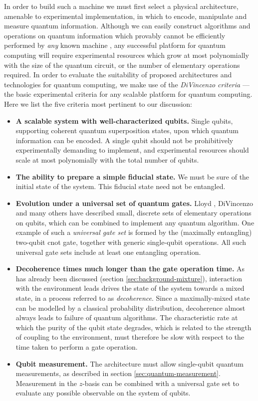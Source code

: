 In order to build such a machine we must first select a physical architecture, amenable to experimental implementation, in which to encode, manipulate and measure quantum information. 
Although we can easily construct algorithms and operations on quantum information which provably cannot be efficiently performed by \emph{any} known machine \cite{Nielsen2004}, any successful platform for quantum computing will require experimental resources which grow at most polynomially with the size of the quantum circuit, or the number of elementary operations required. In order to evaluate the suitability of proposed architectures and technologies for quantum computing, we make use of the \emph{DiVincenzo criteria} \cite{DiVincenzo2000} --- the basic experimental criteria for any scalable platform for quantum computing. Here we list the five criteria most pertinent to our discussion:
\begin{itemize}
    \item \textbf{A scalable system with well-characterized qubits.} Single qubits, supporting coherent quantum superposition states, upon which quantum information can be encoded. A single qubit should not be prohibitively experimentally demanding to implement, and experimental resources should scale at most polynomially with the total number of qubits.
    \item \textbf{The ability to prepare a simple fiducial state.} We must be sure of the initial state of the system. This fiducial state need not be entangled.
    \item \textbf{Evolution under a universal set of quantum gates.} Lloyd \cite{Lloyd1995a}, DiVincenzo \cite{DiVincenzo1995} and many others have described small, discrete sets of elementary operations on qubits, which can be combined to implement any quantum algorithm. One example of such a \emph{universal gate set} is formed by the (maximally entangling) two-qubit \gls{cnot} gate, together with generic single-qubit operations. All such universal gate sets include at least one entangling operation.
    \item \textbf{Decoherence times much longer than the gate operation time.}
        As has already been discussed (section \ref{sec:background-mixture}), interaction with the environment leads drives the state of the system towards a mixed state, in a process referred to as \emph{decoherence}. Since a maximally-mixed state can be modelled by a classical probability distribution, decoherence almost always leads to failure of quantum algorithms. The characteristic rate at which the purity of the qubit state degrades, which is related to the strength of coupling to the environment, must therefore be slow with respect to the time taken to perform a gate operation.
    \item \textbf{Qubit measurement.} The architecture must allow single-qubit quantum measurements, as described in section \ref{sec:quantum-measurement}. Measurement in the $z$-basis can be combined with a universal gate set to evaluate any possible observable on the system of qubits.
\end{itemize}

